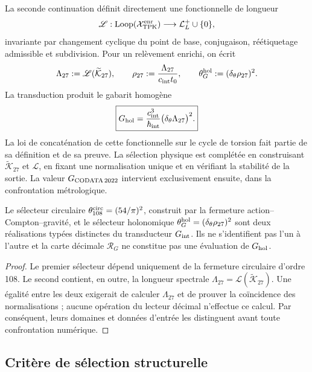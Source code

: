 La seconde continuation définit directement une fonctionnelle de longueur
\[
 \mathscr L:
 \operatorname{Loop}(\mathcal X_{\rm TPK}^{\rm enr})
 \longrightarrow\mathcal L_L^+\cup\{0\},
\]
invariante par changement cyclique du point de base, conjugaison, réétiquetage
admissible et subdivision. Pour un relèvement enrichi, on écrit
\[
 \Lambda_{27}:=\mathscr L(\widetilde{\mathcal K}_{27}),
 \qquad
 \rho_{27}:=\frac{\Lambda_{27}}{c_{\rm int}t_0},
 \qquad
 \theta_G^{\rm hol}:=(\delta_\theta\rho_{27})^2.
\]
La transduction produit le gabarit homogène
\begin{equation}
 \boxed{
 G_{\rm hol}
 =\frac{c_{\rm int}^{3}}{\hbar_{\rm int}}
  \bigl(\delta_\theta\Lambda_{27}\bigr)^2.}
 \label{eq:plantilla-holonomia-G-rev11}
\end{equation}
La loi de concaténation de cette fonctionnelle sur le cycle de torsion fait
partie de sa définition et de sa preuve. La sélection physique est complétée
en construisant \(\widetilde{\mathcal K}_{27}\) et \(\mathscr L\), en fixant une
normalisation unique et en vérifiant la stabilité de la sortie. La valeur
\(G_{\rm CODATA\,2022}\) intervient exclusivement ensuite, dans la confrontation
métrologique.

\begin{proposition}
\label{prop:separacion-selectores-G}
Le sélecteur circulaire
\(\theta_{108}^{\rm circ}=(54/\pi)^2\), construit par la fermeture
action--Compton--gravité, et le sélecteur holonomique
\(\theta_G^{\rm hol}=(\delta_\theta\rho_{27})^2\) sont deux réalisations
typées distinctes du transducteur \(G_{\rm int}\). Ils ne s'identifient pas l'un à
l'autre et la carte décimale \(\mathscr R_G\) ne constitue pas une évaluation de
\(G_{\rm hol}\).
\end{proposition}
\begin{proof}
Le premier sélecteur dépend uniquement de la fermeture circulaire d'ordre 108. Le
second contient, en outre, la longueur spectrale
\(\Lambda_{27}=\mathscr L(\widetilde{\mathcal K}_{27})\). Une égalité
entre les deux exigerait de calculer \(\Lambda_{27}\) et de prouver la coïncidence des
normalisations ; aucune opération du lecteur décimal n'effectue ce calcul.
Par conséquent, leurs domaines et données d'entrée les distinguent avant toute
confrontation numérique.
\end{proof}

\subsection{Critère de sélection structurelle}

